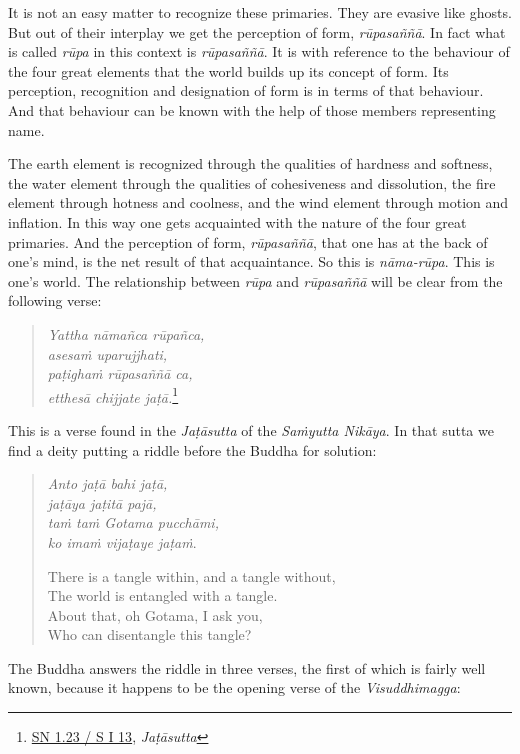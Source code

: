 It is not an easy matter to recognize these primaries. They are evasive like ghosts. But out of their interplay we get the perception of form, \emph{rūpasaññā}. In fact what is called \emph{rūpa} in this context is \emph{rūpasaññā}. It is with reference to the behaviour of the four great elements that the world builds up its concept of form. Its perception, recognition and designation of form is in terms of that behaviour. And that behaviour can be known with the help of those members representing name.

The earth element is recognized through the qualities of hardness and softness, the water element through the qualities of cohesiveness and dissolution, the fire element through hotness and coolness, and the wind element through motion and inflation. In this way one gets acquainted with the nature of the four great primaries. And the perception of form, \emph{rūpasaññā}, that one has at the back of one's mind, is the net result of that acquaintance. So this is \emph{nāma-rūpa}. This is one's world. The relationship between \emph{rūpa} and \emph{rūpasaññā} will be clear from the following verse:

\begin{quote}
\emph{Yattha nāmañca rūpañca,}\\
\emph{asesaṁ uparujjhati,}\\
\emph{paṭighaṁ rūpasaññā ca,}\\
\emph{etthesā chijjate jaṭā.}\footnote{\href{https://suttacentral.net/sn1.23/pli/ms}{SN 1.23 / S I 13}, \emph{Jaṭāsutta}}
\end{quote}

This is a verse found in the \emph{Jaṭāsutta} of the \emph{Saṁyutta Nikāya}. In that sutta we find a deity putting a riddle before the Buddha for solution:

\begin{quote}
\emph{Anto jaṭā bahi jaṭā,}\\
\emph{jaṭāya jaṭitā pajā,}\\
\emph{taṁ taṁ Gotama pucchāmi,}\\
\emph{ko imaṁ vijaṭaye jaṭaṁ}.

There is a tangle within, and a tangle without,\\
The world is entangled with a tangle.\\
About that, oh Gotama, I ask you,\\
Who can disentangle this tangle?
\end{quote}

The Buddha answers the riddle in three verses, the first of which is fairly well known, because it happens to be the opening verse of the \emph{Visuddhimagga}:

